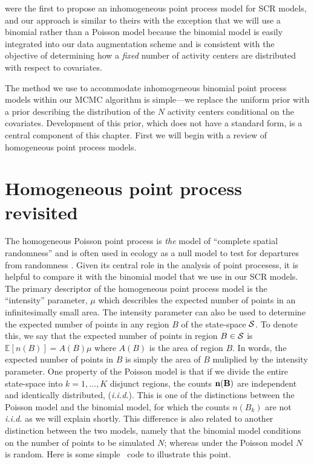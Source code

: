 \citet{borchers_efford:2008} were the first to propose an
inhomogeneous point process model for SCR models, and our approach is
similar to theirs with the exception that we will use a binomial
rather than a Poisson model because the binomial model is
easily integrated into our data augmentation scheme and is consistent
with the objective of determining how a {\it fixed} number of activity
centers are distributed with respect to covariates.

The method we use to accommodate inhomogeneous binomial point process
models within our MCMC algorithm is simple---we
replace the uniform prior with a prior describing the
distribution of the $N$ activity centers conditional on the
covariates. Development of this prior, which does not have a
standard form, is a central component of this chapter. First we will
begin with a review of homogeneous point process models.


\section{Homogeneous point process revisited}

The homogeneous Poisson point process is \emph{the} model of ``complete
spatial randomness'' and is often used in ecology as a null model
to test for departures from randomness
\citep{diggle:2003,illian_etal:2008}. Given its central role in the
analysis of point procesess, it is helpful to compare it with
the binomial model that we use in our SCR models. The
primary descriptor of the homogeneous point process model is the
``intensity'' parameter, $\mu$ which describles the expected number
of points in an infinitesimally small area. The intensity
parameter can also be used to determine the expected number of points
in any region $B$ of the state-space $\cal{S}$. To denote this, we say
that the expected number of points in region $B \in \cal{S}$ is
$\mathbb{E}[n(B)] = A(B)\mu$ where $A(B)$ is the area of region $B$.  In words,
the expected number of points in $B$ is simply the area of $B$
muliplied by the intensity parameter. One property
of the Poisson model is that if we divide the entire state-space into
$k=1,\dots,K$ disjunct regions, the counts $\bf n(B)$ are
independent and identically distributed, ({\it i.i.d.}). This is one
of the distinctions between the Poisson model and the binomial model,
for which the counts $n(B_k)$ are not {\it i.i.d.} as we will explain
shortly. This difference is also related to another distinction
between the two models, namely that the binomial model
conditions on the number of points to be simulated $N$; whereas under
the Poisson model $N$ is random. Here is some simple \R~code to
illustrate this point.

